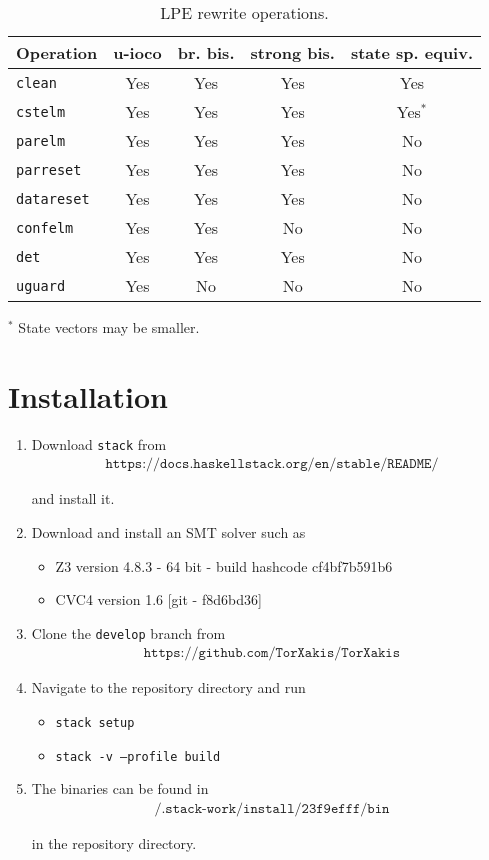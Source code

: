 \begin{table}[!ht]
\begin{center}
\begin{tabularx}{\linewidth}{X|c|c|c|c|}
\textbf{Operation} & \textbf{u-ioco} & \textbf{br. bis.} & \textbf{strong bis.} & \textbf{state sp. equiv.} \\ \hline
\texttt{clean} & Yes & Yes & Yes & Yes \\ \hline
\texttt{cstelm} & Yes & Yes & Yes & Yes$^{*}$ \\ \hline
\texttt{parelm} & Yes & Yes & Yes & No \\ \hline
\texttt{parreset} & Yes & Yes & Yes & No \\ \hline
\texttt{datareset} & Yes & Yes & Yes & No \\ \hline
\texttt{confelm} & Yes & Yes & No & No \\ \hline
\texttt{det} & Yes & Yes & Yes & No \\ \hline
\texttt{uguard} & Yes & No & No & No \\ \hline
\end{tabularx}
\caption{LPE rewrite operations.}
$^{*}$ State vectors may be smaller.
\label{tab:lperewriteopsprops}
\end{center}
\end{table}

\section{Installation}

\begin{enumerate}
\item Download \texttt{stack} from
\begin{align*}
\texttt{https://docs.haskellstack.org/en/stable/README/}
\end{align*}

and install it.

\item Download and install an SMT solver such as
\begin{itemize}
\item Z3 version 4.8.3 - 64 bit - build hashcode cf4bf7b591b6
\item CVC4 version 1.6 [git - f8d6bd36]
\end{itemize}
\item Clone the \texttt{develop} branch from
\begin{align*}
\texttt{https://github.com/TorXakis/TorXakis}
\end{align*}
\item Navigate to the repository directory and run
\begin{itemize}
\item \texttt{stack setup}
\item \texttt{stack -v --profile build}
\end{itemize}
\item The \txs{} binaries can be found in
\begin{align*}
\texttt{/.stack-work/install/23f9efff/bin}
\end{align*}

in the repository directory.
\end{enumerate}

